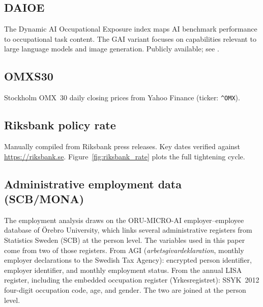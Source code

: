 \documentclass[preprint,12pt,authoryear]{elsarticle}
\begin{document}
\subsection{DAIOE}
The Dynamic AI Occupational Exposure index maps AI benchmark performance to occupational task content. The GAI variant focuses on capabilities relevant to large language models and image generation. Publicly available; see \citet{engberg2024daioe}.

\subsection{OMXS30}
Stockholm OMX~30 daily closing prices from Yahoo Finance (ticker: \texttt{\^{}OMX}).

\subsection{Riksbank policy rate}
Manually compiled from Riksbank press releases. Key dates verified against \url{https://riksbank.se}. Figure~\ref{fig:riksbank_rate} plots the full tightening cycle.

\subsection{Administrative employment data (SCB/MONA)}

The employment analysis draws on the ORU-MICRO-AI employer--employee database of \"Orebro University, which links several administrative registers from Statistics Sweden (SCB) at the person level. The variables used in this paper come from two of those registers. From AGI (\emph{arbetsgivardeklaration}, monthly employer declarations to the Swedish Tax Agency): encrypted person identifier, employer identifier, and monthly employment status. From the annual LISA register, including the embedded occupation register (Yrkesregistret): SSYK~2012 four-digit occupation code, age, and gender. The two are joined at the person level.
\end{document}
